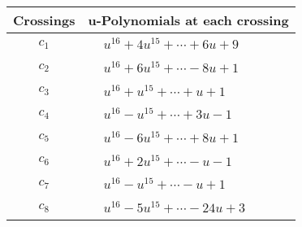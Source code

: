 \documentclass[1p]{elsarticle_modified}
\theoremstyle{definition}
\begin{document}
\begin{tabular}{m{50pt}|m{274pt}}
Crossings & \hspace{64pt}u-Polynomials at each crossing \\
\hline $$\begin{aligned}c_{1}\end{aligned}$$&$\begin{aligned}
&u^{16}+4 u^{15}+\cdots+6 u+9
\end{aligned}$\\
\hline $$\begin{aligned}c_{2}\end{aligned}$$&$\begin{aligned}
&u^{16}+6 u^{15}+\cdots-8 u+1
\end{aligned}$\\
\hline $$\begin{aligned}c_{3}\end{aligned}$$&$\begin{aligned}
&u^{16}+u^{15}+\cdots+u+1
\end{aligned}$\\
\hline $$\begin{aligned}c_{4}\end{aligned}$$&$\begin{aligned}
&u^{16}- u^{15}+\cdots+3 u-1
\end{aligned}$\\
\hline $$\begin{aligned}c_{5}\end{aligned}$$&$\begin{aligned}
&u^{16}-6 u^{15}+\cdots+8 u+1
\end{aligned}$\\
\hline $$\begin{aligned}c_{6}\end{aligned}$$&$\begin{aligned}
&u^{16}+2 u^{15}+\cdots- u-1
\end{aligned}$\\
\hline $$\begin{aligned}c_{7}\end{aligned}$$&$\begin{aligned}
&u^{16}- u^{15}+\cdots- u+1
\end{aligned}$\\
\hline $$\begin{aligned}c_{8}\end{aligned}$$&$\begin{aligned}
&u^{16}-5 u^{15}+\cdots-24 u+3
\end{aligned}$\\

\end{tabular}
\end{document}
